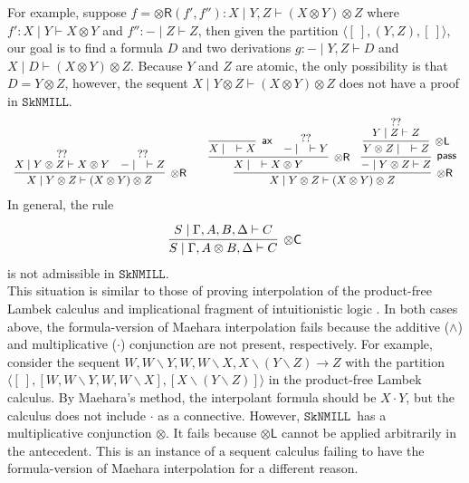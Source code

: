 \documentclass[sn-mathphys-num]{sn-jnl}%
\newcommand{\GG}{\Gamma}
\newcommand{\GD}{\Delta}
\newcommand{\vd}{\vdash}
\newcommand{\tl}{\otimes \mathsf{L}}
\newcommand{\tr}{\otimes\mathsf{R}}
\newcommand{\pass}{\mathsf{pass}}
\newcommand{\ax}{\mathsf{ax}}
\newcommand{\ot}{\otimes}
\newcommand{\bsls}{\backslash}
\newcommand{\SkNMILL}{$\mathtt{SkNMILL}$}
\newcommand{\mf}[1]{\mathsf{#1}}
\theoremstyle{thmstyleone}%
\theoremstyle{thmstyletwo}%
\theoremstyle{thmstylethree}%
\begin{document}
For example, suppose $f = \tr (f',f''): X \mid Y, Z \vd (X\ot Y)\ot Z$ where $f':X \mid Y \vd X\ot Y$ and $f'': {-} \mid Z \vd Z$, then given the partition $\langle [\ ], (Y,Z), [\ ]\rangle$, our goal is to find a formula $D$ and two derivations $g: {-} \mid Y, Z \vd D$ and $X \mid D \vd (X\ot Y)\ot Z$.
Because $Y$ and $Z$ are atomic, the only possibility is that $D = Y \ot Z$, however, the sequent $X \mid Y \ot Z \vd (X \ot Y) \ot Z$ does not have a proof in \SkNMILL.
\begin{equation*}\label{example:ccut:failure}
  \small\begin{array}{c}
    \infer[\tr]{X \mid Y \ot Z \vd (X \ot Y) \ot Z}{
    \deduce{X \mid Y\ot Z \vd X \ot Y}{??}
    &
    \deduce{{-} \mid \quad \vd Z}{??}
  }
  \qquad
  \infer[\tr]{X \mid Y \ot Z \vd (X \ot Y) \ot Z}{
    \infer[\tr]{X \mid \quad \vd X \ot Y}{
      \infer[\ax]{X \mid \quad \vd X}{}
      &
      \deduce{{-} \mid \quad \vd Y}{??}
    }
    &
    \infer[\pass]{{-} \mid Y \ot Z \vd Z}{
      \infer[\tl]{Y \ot Z \mid \quad \vd Z}{
        \deduce{Y \mid Z \vd Z}{??}
      }
    }
  }
  \end{array}
\end{equation*}
In general, the rule
\begin{displaymath}
\begin{array}{c}
  \infer[\ot\mf{C}]{S \mid \GG , A \ot B , \GD \vd C}{
    \deduce{S \mid \GG, A , B , \GD \vd C}{}
  }
\end{array}
\end{displaymath}
is not admissible in \SkNMILL.
\\
This situation is similar to those of proving interpolation of the product-free Lambek calculus \cite{Pentus1997} and implicational fragment of intuitionistic logic \cite{Kanazawa2006}.
In both cases above, the formula-version of Maehara interpolation fails  because the additive ($\land$) and multiplicative ($\cdot$) conjunction are not present, respectively.
For example, consider the sequent $W, W\bsls Y, W , W \bsls X , X \bsls (Y \bsls Z) \longrightarrow Z $ with the partition $\langle [\ ] , [W, W\bsls Y, W , W \bsls X], [X \bsls (Y \bsls Z)] \rangle$ in the product-free Lambek calculus.
By Maehara's method, the interpolant formula should be $X \cdot Y$, but the calculus does not include $\cdot$ as a connective.
However, \SkNMILL~has a multiplicative conjunction $\ot$.
It fails because $\tl$ cannot be applied arbitrarily in the antecedent.
This is an instance of a sequent calculus failing to have the formula-version of Maehara interpolation for a different reason.
\end{document}
